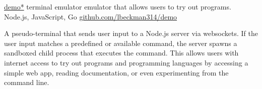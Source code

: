 \showoff
{\href{https://liambeckman.com/code/demo}{demo*}}
{terminal emulator emulator that allows users to try out programs.}
{Node.js, JavaScript, Go}
{\href{https://github.com/lbeckman314/demo}{github.com/lbeckman314/demo}}

A pseudo-terminal that sends user input to a Node.js server via websockets. If the user input matches a predefined or available command, the server spawns a sandboxed child process that executes the command. This allows users with internet access to try out programs and programming languages by accessing a simple web app, reading documentation, or even experimenting from the command line.

\myBreak
